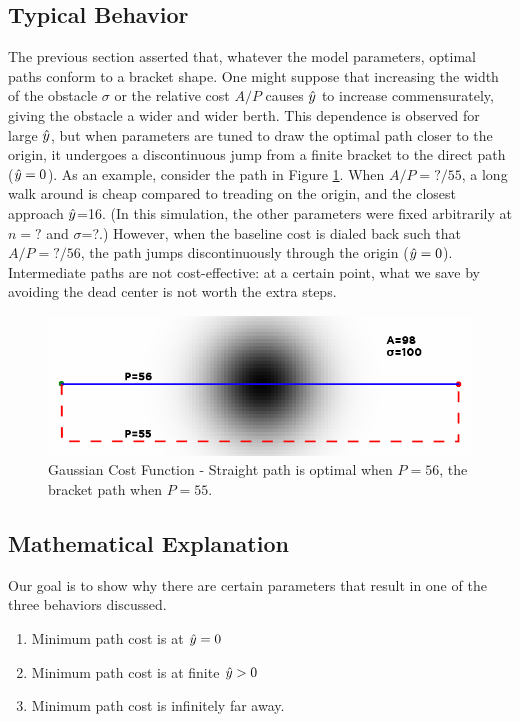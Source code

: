 \subsection{Typical Behavior}

The previous section asserted that, whatever the model parameters, optimal paths conform to a bracket shape. One might suppose that increasing the width of the obstacle $\sigma$ or the relative cost $A/P$ causes $\hat{y}$ to increase commensurately, giving the obstacle a wider and wider berth. This dependence is observed for large $\hat{y}$, but when parameters are tuned to draw the optimal path closer to the origin, it undergoes a discontinuous jump from a finite bracket to the direct path ($\hat{y}=0$). As an example, consider the path in Figure \ref{fig:gaussian}. When $A/P=?/55$, a long walk around is cheap compared to treading on the origin, and the closest approach $\hat{y}$=16. (In this simulation, the other parameters were fixed arbitrarily at $n=?$ and $\sigma$=?.) However, when the baseline cost is dialed back such that $A/P=?/56$, the path jumps discontinuously through the origin ($\hat{y}=0$). Intermediate paths are not cost-effective: at a certain point, what we save by avoiding the dead center is not worth the extra steps.

\begin{figure}
\includegraphics[width=\columnwidth]{graphix/Gaussian.png}
\caption{Gaussian Cost Function - Straight path is optimal when $P=56$, the bracket path when $P=55$. }
\label{fig:gaussian}
\end{figure}

\subsection{Mathematical Explanation}
Our goal is to show why there are certain parameters that result in one of the three behaviors discussed. 
\begin{enumerate}
\item Minimum path cost is at $\hat{y}=0$
\item Minimum path cost is at finite $\hat{y}>0$
\item Minimum path cost is infinitely far away. 
\end{enumerate}

